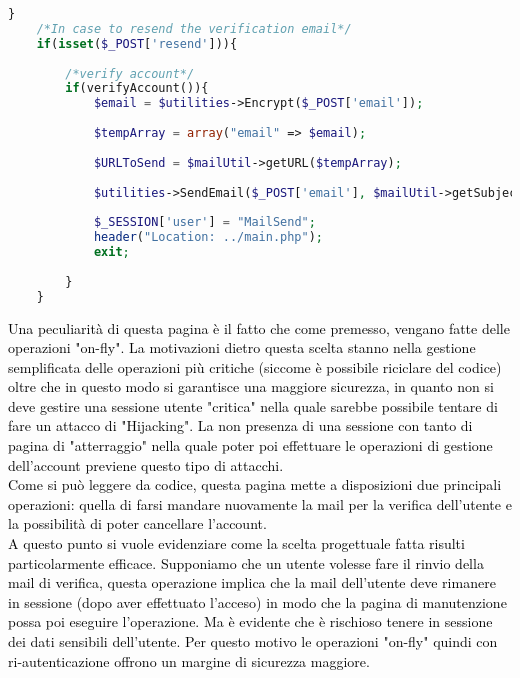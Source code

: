 \begin{lstlisting}[language=php]
	}
	/*In case to resend the verification email*/
	if(isset($_POST['resend'])){
		
		/*verify account*/
		if(verifyAccount()){
			$email = $utilities->Encrypt($_POST['email']);
			
			$tempArray = array("email" => $email);
			
			$URLToSend = $mailUtil->getURL($tempArray);
			
			$utilities->SendEmail($_POST['email'], $mailUtil->getSubject(), $mailUtil->getBody($URLToSend), $mailUtil->getAlternativeBody($URLToSend));
			
			$_SESSION['user'] = "MailSend";
			header("Location: ../main.php");
			exit;
			
		}
	}
\end{lstlisting}

\textcolor{black}{Una peculiarità di questa pagina è il fatto che come premesso, vengano fatte delle operazioni "on-fly". La motivazioni dietro questa scelta stanno nella gestione semplificata delle operazioni più critiche (siccome è possibile riciclare del codice) oltre che in questo modo si garantisce una maggiore sicurezza, in quanto non si deve gestire una sessione utente "critica" nella quale sarebbe possibile tentare di fare un attacco di "Hijacking". La non presenza di una sessione con tanto di pagina di "atterraggio" nella quale poter poi effettuare le operazioni di gestione dell'account previene questo tipo di attacchi.\\
Come si può leggere da codice, questa pagina mette a disposizioni due principali operazioni: quella di farsi mandare nuovamente la mail per la verifica dell'utente e la possibilità di poter cancellare l'account.\\
A questo punto si vuole evidenziare come la scelta progettuale fatta risulti particolarmente efficace. Supponiamo che un utente volesse fare il rinvio della mail di verifica, questa operazione implica che la mail dell'utente deve rimanere in sessione (dopo aver effettuato l'acceso) in modo che la pagina di manutenzione possa poi eseguire l'operazione. Ma è evidente che è rischioso tenere in sessione dei dati sensibili dell'utente. Per questo motivo le operazioni "on-fly" quindi con ri-autenticazione offrono un margine di sicurezza maggiore.}\\